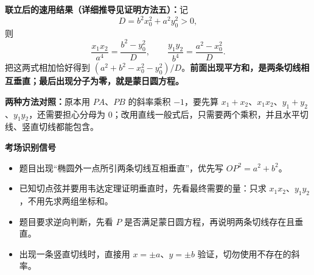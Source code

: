 \begin{explanationbox}
  \medskip
  \textbf{联立后的速用结果（详细推导见证明方法五）：}记
  \[
    D=b^2x_0^2+a^2y_0^2>0,
  \]
  则
  \[
    \boxed{\frac{x_1x_2}{a^4}=\frac{b^2-y_0^2}{D}},\qquad
    \boxed{\frac{y_1y_2}{b^4}=\frac{a^2-x_0^2}{D}}.
  \]
  把这两式相加恰好得到 $(a^2+b^2-x_0^2-y_0^2)/D$。\textbf{前面出现平方和，是两条切线相互垂直；最后出现分子为零，就是蒙日圆方程。}

  \medskip
  \textbf{两种方法对照：}原本用 $PA$、$PB$ 的斜率乘积 $-1$，要先算 $x_1+x_2$、$x_1x_2$、$y_1+y_2$、$y_1y_2$，还需要担心分母为 $0$；改用直线一般式后，只需要两个乘积，并且水平切线、竖直切线都能包含。

  \textbf{\textcolor{CExplanation}{考场识别信号}}
  \begin{itemize}[leftmargin=*, itemsep=0.3em]
    \item 题目出现“椭圆外一点所引两条切线互相垂直”，优先写 $OP^2=a^2+b^2$。
    \item 已知切点弦并要用韦达定理证明垂直时，先看最终需要的量：只求 $x_1x_2$、$y_1y_2$，不用先求两组坐标和。
    \item 题目要求逆向判断，先看 $P$ 是否满足蒙日圆方程，再说明两条切线存在且垂直。
    \item 出现一条竖直切线时，直接用 $x=\pm a$、$y=\pm b$ 验证，切勿使用不存在的斜率。
  \end{itemize}
\end{explanationbox}

